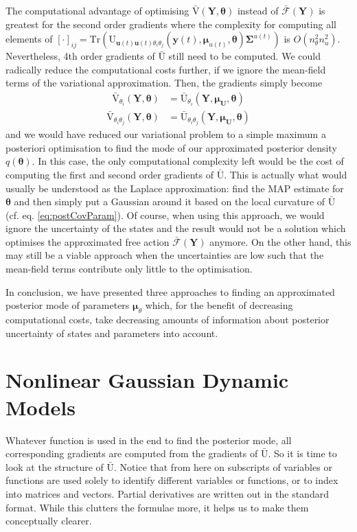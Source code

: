 \documentclass[a4paper,10pt]{article}
\newcommand{\bs}[1]{\mathbf{#1}}					%
\newcommand{\bgs}[1]{\boldsymbol{#1}}				%
\newcommand{\trace}[1]{\mathrm{Tr}\left(#1\right)}					%
\renewcommand{\ss}{u}         %
\newcommand{\so}{y}         %
\renewcommand{\sp}{\theta}    %
\newcommand{\ps}{\bs{\ss}}    %
\newcommand{\po}{\bs{\so}}    %
\newcommand{\pp}{\bgs{\sp}} %
\newcommand{\Ps}{\bs{U}}    %
\newcommand{\Po}{\bs{Y}}    %
\newcommand{\U}{\mathrm{U}}			%
\newcommand{\Ua}{\bar{\mathrm{U}}}		%
\newcommand{\Va}{\bar{\mathrm{V}}}		%
\newcommand{\Fa}{\bar{\mathcal{F}}}		%
\newcommand{\Cov}{\bgs{\Sigma}}			%
\begin{document}
The computational advantage of optimising $\Va(\Po,\pp)$ instead of $\Fa(\Po)$ is greatest for the second order gradients where the complexity for computing all elements of $[\cdot]_{ij} = \trace{\U_{\ps(t)\ps(t)\sp_i\sp_j}(\po(t),\bgs{\mu}_{\ss(t)},\pp)\Cov^{\ss(t)}}$ is $O(n_\sp^2n_\ss^2)$. Nevertheless, 4th order gradients of $\Ua$ still need to be computed. We could radically reduce the computational costs further, if we ignore the mean-field terms of the variational approximation. Then, the gradients simply become
\begin{align}
    \Va_{\sp_i}(\Po,\pp) &= \Ua_{\sp_i}(\Po,\bgs{\mu}_\Ps,\pp)
\end{align}
\begin{align}
    \Va_{\sp_i\sp_j}(\Po,\pp) &= \Ua_{\sp_i\sp_j}(\Po,\bgs{\mu}_\Ps,\pp)
\end{align}
and we would have reduced our variational problem to a simple maximum a posteriori optimisation to find the mode of our approximated posterior density $q(\pp)$. In this case, the only computational complexity left would be the cost of computing the first and second order gradients of $\Ua$. This is actually what would usually be understood as the Laplace approximation: find the MAP estimate for $\pp$ and then simply put a Gaussian around it based on the local curvature of $\Ua$ (cf. eq. \eqref{eq:postCovParam}). Of course, when using this approach, we would ignore the uncertainty of the states and the result would not be a solution which optimises the approximated free action $\Fa(\Po)$ anymore. On the other hand, this may still be a viable approach when the uncertainties are low such that the mean-field terms contribute only little to the optimisation.

In conclusion, we have presented three approaches to finding an approximated posterior mode of parameters $\bgs{\mu}_\sp$ which, for the benefit of decreasing computational costs, take decreasing amounts of information about posterior uncertainty of states and parameters into account.


\section{Nonlinear Gaussian Dynamic Models}
Whatever function is used in the end to find the posterior mode, all corresponding gradients are computed from the gradients of $\Ua$. So it is time to look at the structure of $\Ua$. Notice that from here on subscripts of variables or functions are used solely to identify different variables or functions, or to index into matrices and vectors. Partial derivatives are written out in the standard format. While this clutters the formulae more, it helps us to make them conceptually clearer.
\end{document}
